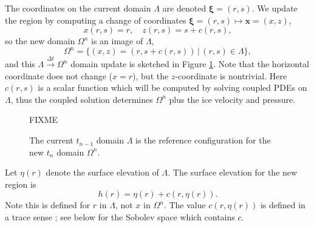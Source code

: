 \documentclass[letterpaper,final,12pt,reqno]{amsart}
\newcommand{\bx}{\mathbf{x}}
\begin{document}
The coordinates on the current domain $\Lambda$ are denoted $\bm{\xi}=(r,s)$.  We update the region by computing a change of coordinates $\bm{\xi} = (r,s) \mapsto \bx = (x,z)$,
\begin{equation}
x(r,s)=r, \quad z(r,s)=s+c(r,s), \label{changecoords}
\end{equation}
so the new domain $\Omega^n$ is an image of $\Lambda$,
\begin{equation}
\Omega^n = \{(x,z)=(r,s+c(r,s)) \,\big|\, (r,s) \in \Lambda\}, \label{updateddomain}
\end{equation}
and this $\Lambda \stackrel{\Delta t}{\to} \Omega^n$ domain update is sketched in Figure \ref{fig:domainupdate}.  Note that the horizontal coordinate does not change ($x=r$), but the $z$-coordinate is nontrivial.  Here $c(r,s)$ is a scalar function which will be computed by solving coupled PDEs on $\Lambda$, thus the coupled solution determines $\Omega^n$ plus the ice velocity and pressure.

\begin{figure}[h]
FIXME

\caption{The current $t_{n-1}$ domain $\Lambda$ is the reference configuration for the new $t_n$ domain $\Omega^n$.}
\label{fig:domainupdate}
\end{figure}

Let $\eta(r)$ denote the surface elevation of $\Lambda$.  The surface elevation for the new region is
\begin{equation}
h(r) = \eta(r) + c(r,\eta(r)).  \label{newsurfaceelevation}
\end{equation}
Note this is defined for $r$ in $\Lambda$, not $x$ in $\Omega^n$.  The value $c(r,\eta(r))$ is defined in a trace sense \cite{Evans2010}; see below for the Sobolev space which contains $c$.
\end{document}
